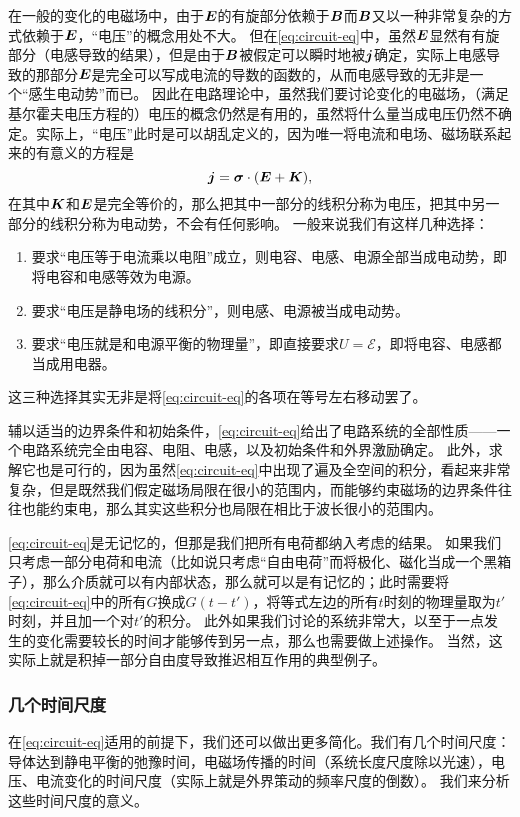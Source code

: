 \documentclass[UTF8, a4paper]{ctexart}
\begin{document}
在一般的变化的电磁场中，由于$\vb*{E}$的有旋部分依赖于$\vb*{B}$而$\vb*{B}$又以一种非常复杂的方式依赖于$\vb*{E}$，“电压”的概念用处不大。
但在\eqref{eq:circuit-eq}中，虽然$\vb*{E}$显然有有旋部分（电感导致的结果），但是由于$\vb*{B}$被假定可以瞬时地被$\vb*{j}$确定，实际上电感导致的那部分$\vb*{E}$是完全可以写成电流的导数的函数的，从而电感导致的无非是一个“感生电动势”而已。
因此在电路理论中，虽然我们要讨论变化的电磁场，（满足基尔霍夫电压方程的）电压的概念仍然是有用的，虽然将什么量当成电压仍然不确定。实际上，“电压”此时是可以胡乱定义的，因为唯一将电流和电场、磁场联系起来的有意义的方程是
\[
    \vb*{j} = \vb*{\sigma} \cdot (\vb*{E} + \vb*{K}),
\]
在其中$\vb*{K}$和$\vb*{E}$是完全等价的，那么把其中一部分的线积分称为电压，把其中另一部分的线积分称为电动势，不会有任何影响。
一般来说我们有这样几种选择：
\begin{enumerate}
    \item 要求“电压等于电流乘以电阻”成立，则电容、电感、电源全部当成电动势，即将电容和电感等效为电源。
    \item 要求“电压是静电场的线积分”，则电感、电源被当成电动势。
    \item 要求“电压就是和电源平衡的物理量”，即直接要求$U=\mathcal{E}$，即将电容、电感都当成用电器。
\end{enumerate}
这三种选择其实无非是将\eqref{eq:circuit-eq}的各项在等号左右移动罢了。

辅以适当的边界条件和初始条件，\eqref{eq:circuit-eq}给出了电路系统的全部性质——一个电路系统完全由电容、电阻、电感，以及初始条件和外界激励确定。
此外，求解它也是可行的，因为虽然\eqref{eq:circuit-eq}中出现了遍及全空间的积分，看起来非常复杂，但是既然我们假定磁场局限在很小的范围内，而能够约束磁场的边界条件往往也能约束电，那么其实这些积分也局限在相比于波长很小的范围内。

\eqref{eq:circuit-eq}是无记忆的，但那是我们把所有电荷都纳入考虑的结果。
如果我们只考虑一部分电荷和电流（比如说只考虑“自由电荷”而将极化、磁化当成一个黑箱子），那么介质就可以有内部状态，那么就可以是有记忆的；此时需要将\eqref{eq:circuit-eq}中的所有$G$换成$G(t-t')$，将等式左边的所有$t$时刻的物理量取为$t'$时刻，并且加一个对$t'$的积分。
此外如果我们讨论的系统非常大，以至于一点发生的变化需要较长的时间才能够传到另一点，那么也需要做上述操作。
当然，这实际上就是积掉一部分自由度导致推迟相互作用的典型例子。

\subsubsection{几个时间尺度}

在\eqref{eq:circuit-eq}适用的前提下，我们还可以做出更多简化。我们有几个时间尺度：导体达到静电平衡的弛豫时间，电磁场传播的时间（系统长度尺度除以光速），电压、电流变化的时间尺度（实际上就是外界策动的频率尺度的倒数）。
我们来分析这些时间尺度的意义。
\end{document}
